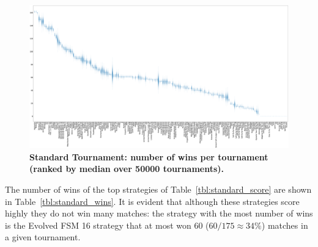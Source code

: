 \documentclass[10pt,letterpaper]{article}
\begin{document}
\begin{landscape}
    \begin{figure}[!hbtp]
        \centering
        \includegraphics[width=\paperwidth]{standard_wins_boxplots.eps}
        \caption{\bf Standard Tournament: number of wins per tournament (ranked by
        median over
        50000 tournaments).}
        \label{fig:standard_winplot}
    \end{figure}
\end{landscape}

The number of wins of the top strategies of Table~\ref{tbl:standard_score} are
shown in Table~\ref{tbl:standard_wins}. It is evident that although these
strategies score highly they do not win many matches: the strategy with the most
number of wins is the Evolved FSM 16 strategy that at most won 60
(\(60/175\approx34\%\)) matches in a given tournament.
\end{document}
